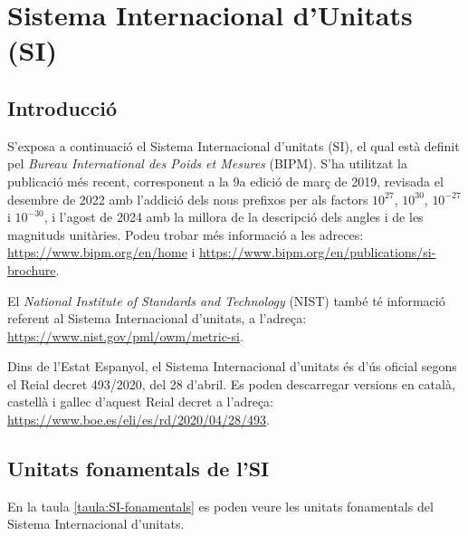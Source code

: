 \chapter{Sistema Internacional d'Unitats (SI)}\label{sec:SI}

\section{Introducció}\label{sec:SI-intro}
S'exposa a continuació el Sistema
Internacional d'unitats (SI), el qual està definit pel  \textit{Bureau
International des Poids et Mesures} (BIPM). S'ha utilitzat la publicació més recent, corresponent a la 9a edició de març de 2019, revisada el desembre de  2022 amb l'addició dels nous prefixos per als factors $10^{27}$,  $10^{30}$,  $10^{-27}$ i  $10^{-30}$, i l'agost de 2024 amb la millora de la descripció dels angles i de les magnituds unitàries. Podeu trobar més informació a les adreces: \href{https://www.bipm.org/en/home/}{https:/\!\!/www.bipm.org/en/home} i \href{https://www.bipm.org/en/publications/si-brochure/}{https:/\!\!/www.bipm.org/en/publications/si-brochure}. 

El  \textit{National Institute of Standards and Technology} (NIST) també té informació referent al Sistema
Internacional d'unitats, a l'adreça: \href{https://www.nist.gov/pml/owm/metric-si}
{https:/\!\!/www.nist.gov/pml/owm/metric-si}.

Dins de l'Estat Espanyol, el Sistema Internacional d'unitats és d'ús oficial segons el Reial decret 493/2020, del 28 d'abril. Es poden descarregar versions en català, castellà i gallec d'aquest Reial decret a l'adreça: \href{https://www.boe.es/eli/es/rd/2020/04/28/493}
{https:/\!\!/www.boe.es/eli/es/rd/2020/04/28/493}.

\section{Unitats fonamentals de l'SI}

En la taula \vref{taula:SI-fonamentals} es poden veure les unitats
fonamentals del Sistema Internacional d'unitats.

